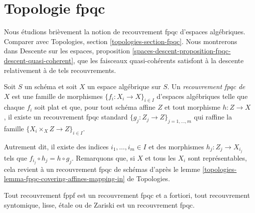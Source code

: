 \section{Topologie fpqc}
\label{section-fpqc}

\noindent
Nous étudions brièvement la notion de recouvrement fpqc d'espaces algébriques.
Comparer avec
Topologies, section \ref{topologies-section-fpqc}.
Nous montrerons dans
Descente sur les espaces,
proposition \ref{spaces-descent-proposition-fpqc-descent-quasi-coherent},
que les faisceaux quasi-cohérents satisfont à la descente relativement à de tels recouvrements.

\begin{definition}
\label{definition-fpqc-covering}
Soit $S$ un schéma et soit $X$ un espace algébrique sur $S$.
Un {\it recouvrement fpqc de $X$} est une famille de morphismes
$\{f_i : X_i \to X\}_{i \in I}$ d'espaces algébriques
telle que chaque $f_i$ soit plat et que, pour tout schéma affine
$Z$ et tout morphisme $h : Z \to X$, il existe un recouvrement fpqc standard
$\{g_j : Z_j \to Z\}_{j = 1, \ldots, m}$ qui raffine la famille
$\{X_i \times_X Z \to Z\}_{i \in I}$.
\end{definition}

\noindent
Autrement dit, il existe des indices $i_1, \ldots, i_m \in I$ et des
morphismes $h_j : Z_j \to X_{i_j}$ tels que
$f_{i_j} \circ h_j = h \circ g_j$. Remarquons que, si $X$ et tous les $X_i$ sont
représentables, cela revient à un recouvrement fpqc de schémas d'après le
lemme \ref{topologies-lemma-fpqc-covering-affines-mapping-in} de Topologies.

\begin{lemma}
\label{lemma-zariski-etale-smooth-syntomic-fppf-fpqc}
Tout recouvrement fppf est un recouvrement fpqc et a fortiori,
tout recouvrement syntomique, lisse, \'etale ou de Zariski est un recouvrement fpqc.
\end{lemma}

